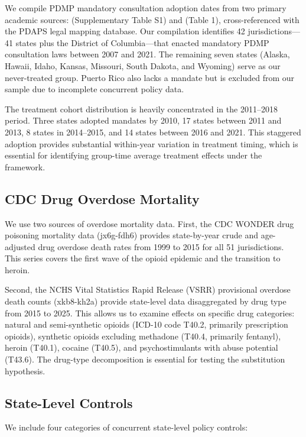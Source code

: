 \documentclass[12pt]{article}
\begin{document}
We compile PDMP mandatory consultation adoption dates from two primary academic sources: \citet{gunadi2023effect} (Supplementary Table S1) and \citet{buchmueller2018effect} (Table 1), cross-referenced with the PDAPS legal mapping database. Our compilation identifies 42 jurisdictions---41 states plus the District of Columbia---that enacted mandatory PDMP consultation laws between 2007 and 2021. The remaining seven states (Alaska, Hawaii, Idaho, Kansas, Missouri, South Dakota, and Wyoming) serve as our never-treated group. Puerto Rico also lacks a mandate but is excluded from our sample due to incomplete concurrent policy data.

The treatment cohort distribution is heavily concentrated in the 2011--2018 period. Three states adopted mandates by 2010, 17 states between 2011 and 2013, 8 states in 2014--2015, and 14 states between 2016 and 2021. This staggered adoption provides substantial within-year variation in treatment timing, which is essential for identifying group-time average treatment effects under the \citet{callaway2021difference} framework.

\subsection{CDC Drug Overdose Mortality}

We use two sources of overdose mortality data. First, the CDC WONDER drug poisoning mortality data (jx6g-fdh6) provides state-by-year crude and age-adjusted drug overdose death rates from 1999 to 2015 for all 51 jurisdictions. This series covers the first wave of the opioid epidemic and the transition to heroin.

Second, the NCHS Vital Statistics Rapid Release (VSRR) provisional overdose death counts (xkb8-kh2a) provide state-level data disaggregated by drug type from 2015 to 2025. This allows us to examine effects on specific drug categories: natural and semi-synthetic opioids (ICD-10 code T40.2, primarily prescription opioids), synthetic opioids excluding methadone (T40.4, primarily fentanyl), heroin (T40.1), cocaine (T40.5), and psychostimulants with abuse potential (T43.6). The drug-type decomposition is essential for testing the substitution hypothesis.

\subsection{State-Level Controls}

We include four categories of concurrent state-level policy controls:
\end{document}
